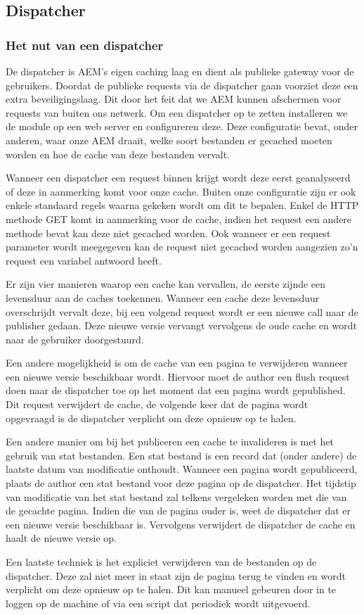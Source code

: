 \documentclass{article}
\begin{document}
	\subsection{Dispatcher}
	\subsubsection{Het nut van een dispatcher}
	De dispatcher is AEM's eigen caching laag en dient als publieke gateway voor de gebruikers. Doordat de publieke requests via de dispatcher gaan voorziet deze een extra beveiligingslaag. Dit door het feit dat we AEM kunnen afschermen voor requests van buiten ons netwerk. Om een dispatcher op te zetten installeren we de module op een web server en configureren deze. Deze configuratie bevat, onder anderen, waar onze AEM draait, welke soort bestanden er gecached moeten worden en hoe de cache van deze bestanden vervalt.
	\par	
	 Wanneer een dispatcher een request binnen krijgt wordt deze eerst geanalyseerd of deze in aanmerking komt voor onze cache. Buiten onze configuratie zijn er ook enkele standaard regels waarna gekeken wordt om dit te bepalen. Enkel de HTTP methode GET komt in aanmerking voor de cache, indien het request een andere methode bevat kan deze niet gecached worden. Ook wanneer er een request parameter wordt meegegeven kan de request niet gecached worden aangezien zo'n request een variabel antwoord heeft.
	\par
	Er zijn vier manieren waarop een cache kan vervallen, de eerste zijnde een levensduur aan de caches toekennen. Wanneer een cache deze levensduur overschrijdt vervalt deze, bij een volgend request wordt er een nieuwe call naar de publisher gedaan. Deze nieuwe versie vervangt vervolgens de oude cache en wordt naar de gebruiker doorgestuurd.
	\par
	Een andere mogelijkheid is om de cache van een pagina te verwijderen wanneer een nieuwe versie beschikbaar wordt. Hiervoor moet de author een flush request doen naar de dispatcher toe op het moment dat een pagina wordt gepublished. Dit request verwijdert de cache, de volgende keer dat de pagina wordt opgevraagd is de dispatcher verplicht om deze opnieuw op te halen.
	\par
	 Een andere manier om bij het publiceren een cache te invalideren is met het gebruik van stat bestanden. Een stat bestand is een record dat (onder andere) de laatste datum van modificatie onthoudt. Wanneer een pagina wordt gepubliceerd, plaats de author een stat bestand voor deze pagina op de dispatcher. Het tijdstip van modificatie van het stat bestand zal telkens vergeleken worden met die van de gecachte pagina. Indien die van de pagina ouder is, weet de dispatcher dat er een nieuwe versie beschikbaar is. Vervolgens verwijdert de dispatcher de cache en haalt de nieuwe versie op.
	 \par
	 Een laatste techniek is het expliciet verwijderen van de bestanden op de dispatcher. Deze zal niet meer in staat zijn de pagina terug te vinden en wordt verplicht om deze opnieuw op te halen. Dit kan manueel gebeuren door in te loggen op de machine of via een script dat periodiek wordt uitgevoerd.
\end{document}
